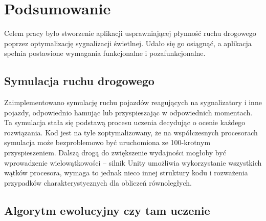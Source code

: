 \chapter*{Podsumowanie}
Celem pracy było stworzenie aplikacji usprawniającej płynność ruchu drogowego poprzez optymalizację sygnalizacji świetlnej. Udało się go osiągnąć, a aplikacja spełnia postawione wymagania funkcjonalne i pozafunkcjonalne. 
\section*{Symulacja ruchu drogowego}
Zaimplementowano symulację ruchu pojazdów reagujących na sygnalizatory i inne pojazdy, odpowiednio hamując lub przyspieszając w odpowiednich momentach. Ta symulacja stała się podstawą procesu uczenia decydując o ocenie każdego rozwiązania. Kod jest na tyle zoptymalizowany, że na współczesnych procesorach symulacja może bezproblemowo być uruchomiona ze 100-krotnym przyspieszeniem. Dalszą drogą do zwiększenie wydajności mogłoby być wprowadzenie wielowątkowości -- silnik Unity umożliwia wykorzystanie wszystkich wątków procesora, wymaga to jednak nieco innej struktury kodu i rozważenia przypadków charakterystycznych dla obliczeń równoległych. 
\section*{Algorytm ewolucyjny czy tam uczenie}